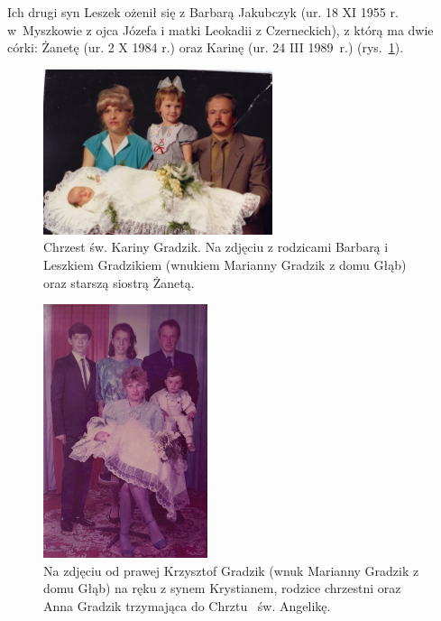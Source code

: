 Ich drugi syn Leszek ożenił się z Barbarą Jakubczyk (ur. 18 XI 1955 r. w~Myszkowie z ojca Józefa i matki Leokadii z Czerneckich), z którą ma dwie córki: Żanetę (ur. 2 X 1984 r.) oraz Karinę (ur. 24 III 1989~r.) (rys.~\ref{rys:leszek_barbara_karina_zaneta_gradzik}).

\begin{figure}[!h]
\begin{center}
\includegraphics[width=0.6\textwidth]{zdjecia/leszek_barbara_karina_zaneta_gradzik.jpg}
\caption[Chrzest św. Kariny Gradzik]{Chrzest św. Kariny Gradzik. Na zdjęciu z rodzicami Barbarą i Leszkiem Gradzikiem (wnukiem Marianny Gradzik z domu Głąb) oraz starszą siostrą Żanetą.}
\label{rys:leszek_barbara_karina_zaneta_gradzik}
\end{center}
\end{figure}

\begin{figure}[!h]
\begin{center}
\includegraphics[width=0.43\textwidth]{zdjecia/chrzest_angeliki_gradzik.jpg}
\caption[Chrzest św. Angeliki Gradzik]{Na zdjęciu od prawej Krzysztof Gradzik (wnuk Marianny Gradzik z domu Głąb) na ręku z synem Krystianem, rodzice chrzestni oraz Anna Gradzik trzymająca do Chrztu~ św. Angelikę.}
\label{rys:chrzest_angeliki_gradzik}
\end{center}
\end{figure}

